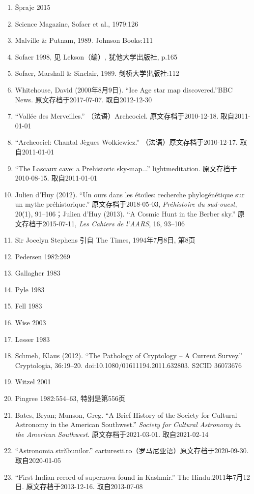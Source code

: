 \begin{enumerate}
    \item Šprajc 2015
    \item Science Magazine, Sofaer et al., 1979:126
    \item Malville \& Putnam, 1989. Johnson Books:111
    \item Sofaer 1998, 见 Lekson（编）, 犹他大学出版社, p.165
    \item Sofaer, Marshall \& Sinclair, 1989. 剑桥大学出版社:112
    \item Whitehouse, David (2000年8月9日). “Ice Age star map discovered.”BBC News. 原文存档于2017-07-07. 取自2012-12-30
    \item “Vallée des Merveilles.” （法语）Archeociel. 原文存档于2010-12-18. 取自2011-01-01
    \item “Archeociel: Chantal Jègues Wolkiewiez.” （法语）原文存档于2010-12-17. 取自2011-01-01
    \item “The Lascaux cave: a Prehistoric sky-map...” lightmeditation. 原文存档于2010-08-15. 取自2011-01-01
    \item Julien d'Huy (2012). “Un ours dans les étoiles: recherche phylogénétique sur un mythe préhistorique.” 原文存档于2018-05-03, \textit{Préhistoire du sud-ouest}, 20(1), 91–106；Julien d'Huy (2013). “A Cosmic Hunt in the Berber sky.” 原文存档于2015-07-11, \textit{Les Cahiers de l'AARS}, 16, 93–106
    \item Sir Jocelyn Stephens 引自 The Times, 1994年7月8日, 第8页
    \item Pedersen 1982:269
    \item Gallagher 1983
    \item Pyle 1983
    \item Fell 1983
    \item Wise 2003
    \item Lesser 1983
    \item Schmeh, Klaus (2012). “The Pathology of Cryptology – A Current Survey.” Cryptologia, 36:19–20. doi:10.1080/01611194.2011.632803. S2CID 36073676
    \item Witzel 2001
    \item Pingree 1982:554–63, 特别是第556页
    \item Bates, Bryan; Munson, Greg. “A Brief History of the Society for Cultural Astronomy in the American Southwest.” \textit{Society for Cultural Astronomy in the American Southwest.} 原文存档于2021-03-01. 取自2021-02-14
    \item “Astronomia străbunilor.” carturesti.ro（罗马尼亚语）原文存档于2020-09-30. 取自2020-01-05
    \item “First Indian record of supernova found in Kashmir.” The Hindu.2011年7月12日. 原文存档于2013-12-16. 取自2013-07-08
\end{enumerate}
